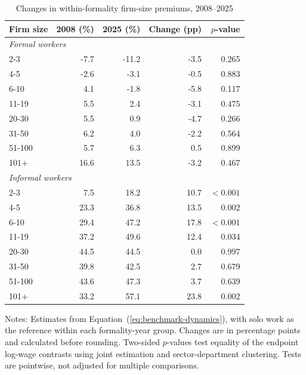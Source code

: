 \begin{table}[htbp]
  \centering
  \caption{Changes in within-formality firm-size premiums, 2008--2025}
  \label{tab:preferred-endpoint-changes}
  \small
  \begin{tabular}{lrrrr}
    \toprule
    Firm size & 2008 (\%) & 2025 (\%) & Change (pp) & $p$-value \\
    \midrule
    \multicolumn{5}{l}{\textit{Formal workers}} \\
    2-3 & -7.7 & -11.2 & -3.5 & 0.265 \\
    4-5 & -2.6 & -3.1 & -0.5 & 0.883 \\
    6-10 & 4.1 & -1.8 & -5.8 & 0.117 \\
    11-19 & 5.5 & 2.4 & -3.1 & 0.475 \\
    20-30 & 5.5 & 0.9 & -4.7 & 0.266 \\
    31-50 & 6.2 & 4.0 & -2.2 & 0.564 \\
    51-100 & 5.7 & 6.3 & 0.5 & 0.899 \\
    101+ & 16.6 & 13.5 & -3.2 & 0.467 \\
    \midrule
    \multicolumn{5}{l}{\textit{Informal workers}} \\
    2-3 & 7.5 & 18.2 & 10.7 & $<0.001$ \\
    4-5 & 23.3 & 36.8 & 13.5 & 0.002 \\
    6-10 & 29.4 & 47.2 & 17.8 & $<0.001$ \\
    11-19 & 37.2 & 49.6 & 12.4 & 0.034 \\
    20-30 & 44.5 & 44.5 & 0.0 & 0.997 \\
    31-50 & 39.8 & 42.5 & 2.7 & 0.679 \\
    51-100 & 43.6 & 47.3 & 3.7 & 0.639 \\
    101+ & 33.2 & 57.1 & 23.8 & 0.002 \\
    \bottomrule
  \end{tabular}
  \vspace{0.3em}
  \begin{minipage}{0.95\textwidth}
  \footnotesize
  Notes: Estimates from Equation~(\ref{eq:benchmark-dynamics}), with solo work as the reference within each formality-year group. Changes are in percentage points and calculated before rounding. Two-sided $p$-values test equality of the endpoint log-wage contrasts using joint estimation and sector-department clustering. Tests are pointwise, not adjusted for multiple comparisons.
  \end{minipage}
\end{table}
